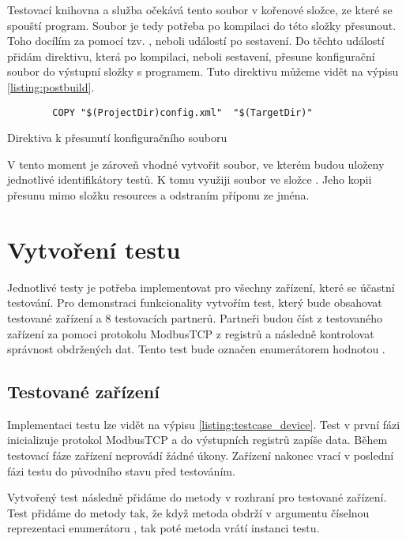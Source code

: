 Testovací knihovna a služba očekává tento soubor v kořenové složce, ze které se spouští program. Soubor je tedy potřeba po kompilaci do této složky přesunout. Toho docílím za pomocí tzv. , neboli událostí po sestavení. Do těchto událostí přidám direktivu, která po kompilaci, neboli sestavení, přesune konfigurační soubor do výstupní složky s programem. Tuto direktivu můžeme vidět na výpisu \ref{listing:postbuild}.

\begin{listing}[htbp]
    \centering
    \begin{verbatim}
        COPY "$(ProjectDir)config.xml"  "$(TargetDir)"
    \end{verbatim}
\caption{Direktiva k přesunutí konfiguračního souboru}
\label{listing:postbuild}
\end{listing}

V tento moment je zároveň vhodné vytvořit soubor, ve kterém budou uloženy jednotlivé identifikátory testů. K tomu využiji soubor  ve složce . Jeho kopii přesunu mimo složku resources a odstraním příponu  ze jména. 

\section{Vytvoření testu}
Jednotlivé testy je potřeba implementovat pro všechny zařízení, které se účastní testování. Pro demonstraci funkcionality vytvořím test, který bude obsahovat testované zařízení a 8 testovacích partnerů. Partneři budou číst z testovaného zařízení za pomoci protokolu ModbusTCP z registrů a následně kontrolovat správnost obdržených dat. Tento test bude označen enumerátorem  hodnotou .


\subsection{Testované zařízení}
Implementaci testu lze vidět na výpisu \ref{listing:testcase_device}. Test v první fázi inicializuje protokol ModbusTCP a do výstupních registrů zapíše data. Během testovací fáze zařízení neprovádí žádné úkony. Zařízení nakonec vrací v poslední fázi testu do původního stavu před testováním.

Vytvořený test následně přidáme do metody  v rozhraní pro testované zařízení. Test přidáme do metody tak, že když metoda obdrží v argumentu číselnou reprezentaci enumerátoru , tak poté metoda vrátí instanci testu.


